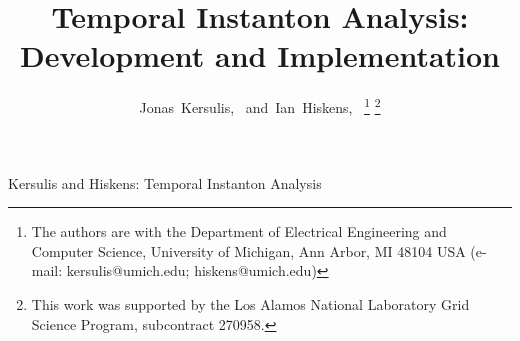 \documentclass[journal,twoside]{IEEEtran}
\begin{document}
%
\title{Temporal Instanton Analysis:\\
Development and Implementation}
%
%
%

\author{Jonas~Kersulis,~
        and~Ian~Hiskens,~%
\thanks{The authors are with the Department of Electrical Engineering and Computer Science, University of Michigan, Ann Arbor, MI 48104 USA (e-mail: 
kersulis@umich.edu; hiskens@umich.edu)}%
\thanks{This work was supported by the Los Alamos National Laboratory Grid Science Program, subcontract 270958.}}

% 
%

%
{Kersulis and Hiskens: Temporal Instanton Analysis}
% 
\end{document}
